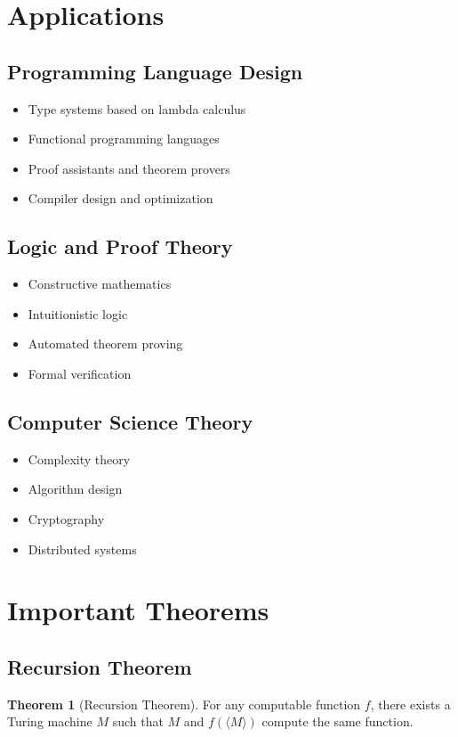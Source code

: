 \documentclass[11pt]{article}
\theoremstyle{definition}
\newtheorem{theorem}{Theorem}[section]
\begin{document}
\section{Applications}

\subsection{Programming Language Design}
\begin{itemize}
    \item Type systems based on lambda calculus
    \item Functional programming languages
    \item Proof assistants and theorem provers
    \item Compiler design and optimization
\end{itemize}

\subsection{Logic and Proof Theory}
\begin{itemize}
    \item Constructive mathematics
    \item Intuitionistic logic
    \item Automated theorem proving
    \item Formal verification
\end{itemize}

\subsection{Computer Science Theory}
\begin{itemize}
    \item Complexity theory
    \item Algorithm design
    \item Cryptography
    \item Distributed systems
\end{itemize}

\section{Important Theorems}

\subsection{Recursion Theorem}
\begin{theorem}[Recursion Theorem]
For any computable function $f$, there exists a Turing machine $M$ such that $M$ and $f(\langle M \rangle)$ compute the same function.
\end{theorem}
\end{document}
